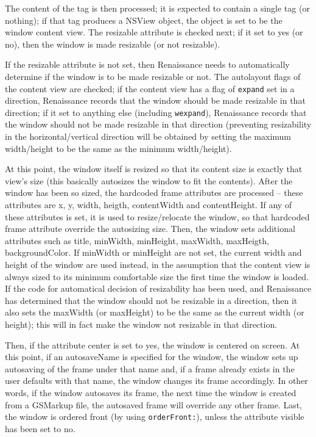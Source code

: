 The content of the tag is then processed; it is expected to contain a
single tag (or nothing); if that tag produces a NSView object, the
object is set to be the window content view.  The resizable attribute
is checked next; if it set to yes (or no), then the window is made
resizable (or not resizable).

If the resizable attribute is not set, then Renaissance needs to
automatically determine if the window is to be made resizable or not.
The autolayout flags of the content view are checked; if the content
view has a flag of \texttt{expand} set in a direction, Renaissance
records that the window should be made resizable in that direction; if
it set to anything else (including \texttt{wexpand}), Renaissance
records that the window should not be made resizable in that direction
(preventing resizability in the horizontal/vertical direction will be
obtained by setting the maximum width/height to be the same as the
minimum width/height).

At this point, the window itself is resized so that its content size
is exactly that view's size (this basically autosizes the window to
fit the contents).  After the window has been so sized, the hardcoded
frame attributes are processed -- these attributes are x, y, width,
heigth, contentWidth and contentHeight.  If any of these attributes is
set, it is used to resize/relocate the window, so that hardcoded frame
attribute override the autosizing size.  Then, the window sets
additional attributes such as title, minWidth, minHeight, maxWidth,
maxHeigth, backgroundColor.  If minWidth or minHeight are not set, the
current width and height of the window are used instead, in the
assumption that the content view is always sized to its minimum
comfortable size the first time the window is loaded.  If the code for
automatical decision of resizability has been used, and Renaissance
has determined that the window should not be resizable in a direction,
then it also sets the maxWidth (or maxHeight) to be the same as the
current width (or height); this will in fact make the window not
resizable in that direction.

Then, if the attribute center is set to yes, the window is centered on
screen.  At this point, if an autosaveName is specified for the
window, the window sets up autosaving of the frame under that name
and, if a frame already exists in the user defaults with that name,
the window changes its frame accordingly.  In other words, if the
window autosaves its frame, the next time the window is created from a
GSMarkup file, the autosaved frame will override any other frame.
Last, the window is ordered front (by using \texttt{orderFront:}),
unless the attribute visible has been set to no.

